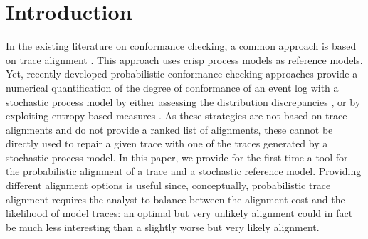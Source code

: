 
\section{Introduction}
\label{introduction}
%
In the existing literature on conformance checking, a common approach is based on trace alignment \cite{DBLP:conf/edoc/AdriansyahDA11}. This approach uses crisp process models as reference models. Yet, recently developed probabilistic conformance checking approaches provide a numerical quantification of the degree of conformance
of an event log with a stochastic process model by either assessing the distribution discrepancies \cite{DBLP:conf/bpm/LeemansSA19}, or by exploiting entropy-based measures \cite{DBLP:conf/icpm/PolyvyanyyK19,DBLP:journals/tosem/PolyvyanyySWCM20}.
As these strategies are not based on trace alignments and do not provide a ranked list of alignments, these cannot be directly used to repair a given trace with one of the traces generated by a stochastic process model.
%
In this paper, we provide for the first time a tool   for the probabilistic alignment of a trace and a stochastic reference
model. %
Providing different alignment options is useful since, conceptually, probabilistic trace alignment requires the analyst to 
balance between the alignment cost and the likelihood of model traces: an optimal but very unlikely alignment could in fact be much less interesting than a slightly worse but very likely alignment.


